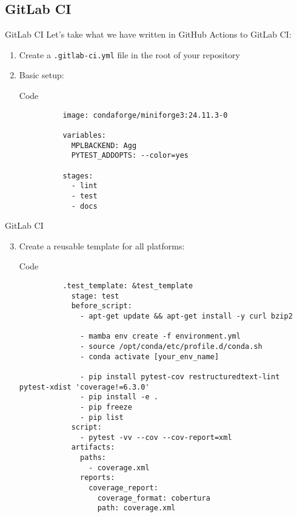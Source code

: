 \subsection{GitLab CI}
\begin{frame}[fragile]{
    GitLab CI
    \hfill
  }
  Let's take what we have written in GitHub Actions to GitLab CI:
  \begin{enumerate}
    \item Create a \texttt{.gitlab-ci.yml} file in the root of your repository
    \item Basic setup:
      \begin{block}{Code}
        \begin{verbatim}
          image: condaforge/miniforge3:24.11.3-0

          variables:
            MPLBACKEND: Agg
            PYTEST_ADDOPTS: --color=yes

          stages:
            - lint
            - test
            - docs
        \end{verbatim}
      \end{block}
  \end{enumerate}
\end{frame}

\begin{frame}[fragile]{GitLab CI}
  \begin{enumerate}
    \setcounter{enumi}{2}
    \item Create a reusable template for all platforms:
      \begin{block}{Code}
        \footnotesize
        \begin{verbatim}
          .test_template: &test_template
            stage: test
            before_script:
              - apt-get update && apt-get install -y curl bzip2

              - mamba env create -f environment.yml
              - source /opt/conda/etc/profile.d/conda.sh
              - conda activate [your_env_name]

              - pip install pytest-cov restructuredtext-lint pytest-xdist 'coverage!=6.3.0'
              - pip install -e .
              - pip freeze
              - pip list
            script:
              - pytest -vv --cov --cov-report=xml
            artifacts:
              paths:
                - coverage.xml
              reports:
                coverage_report:
                  coverage_format: cobertura
                  path: coverage.xml
        \end{verbatim}
      \end{block}
  \end{enumerate}
\end{frame}


